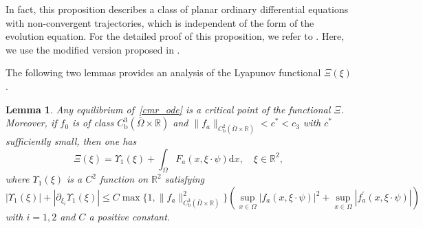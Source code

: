 \documentclass{elsarticle}
\newtheorem{lemma}{Lemma}[section]
\begin{document}
In fact, this proposition describes a class of planar ordinary differential equations with non-convergent trajectories, which is independent of the form of the evolution equation. For the detailed proof of this proposition, we refer to \cite[Proposition 2.1]{polavcik2002nonconvergent}. Here, we use the modified version proposed in \cite[Secion 2.1]{jendoubi2003non}.

The following two lemmas provides an analysis of the Lyapunov functional $\Xi(\xi)$.
\begin{lemma}\label{decomposition_1}
Any equilibrium of~\eqref{cmr_ode} is a critical point of the functional $\Xi$. Moreover, if $f_0$ is of class $ C^3_{\mathrm{b}}(\bar{\Omega}\times\mathbb{R})$ and $\|f_a\|_{C^2_{\mathrm{b}}(\bar{\Omega}\times\mathbb{R})}< c^{\ast} < c_3$ with $c^{\ast}$ sufficiently small, then one has
\[
	\Xi(\xi) = \Upsilon_1(\xi) +  \int_{\Omega}F_a(x, \xi\cdot\psi)\mathrm{d}x, \quad \xi\in\mathbb{R}^2,
\]
where $\Upsilon_1(\xi)$ is a $C^2$ function on $\mathbb{R}^2$ satisfying
\begin{equation} \label{estimates_lyapunov_3}
|\Upsilon_1(\xi)| + |\partial_{\xi_i}\Upsilon_1(\xi)|\leqslant C\max\{1, \|f_a\|^2_{C^3_{\mathrm{b}}(\bar{\Omega}\times\mathbb{R})}\}\left( \sup_{x\in\Omega}|f_a(x, \xi\cdot\psi)|^2 + \sup_{x\in\Omega}|f^{\prime}_a(x, \xi\cdot\psi)| \right)
\end{equation}
with $i=1, 2$ and $C$ a positive constant.
\end{lemma}
\end{document}
